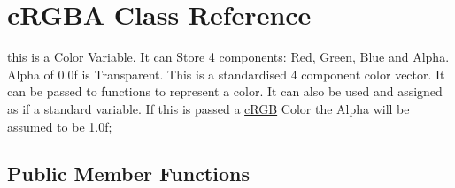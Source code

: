 \hypertarget{classc_r_g_b_a}{
\section{cRGBA Class Reference}
\label{classc_r_g_b_a}
}


this is a Color Variable. It can Store 4 components: Red, Green, Blue and Alpha. Alpha of 0.0f is Transparent. This is a standardised 4 component color vector. It can be passed to functions to represent a color. It can also be used and assigned as if a standard variable. If this is passed a \hyperlink{classc_r_g_b}{cRGB} Color the Alpha will be assumed to be 1.0f;  


\subsection*{Public Member Functions}
